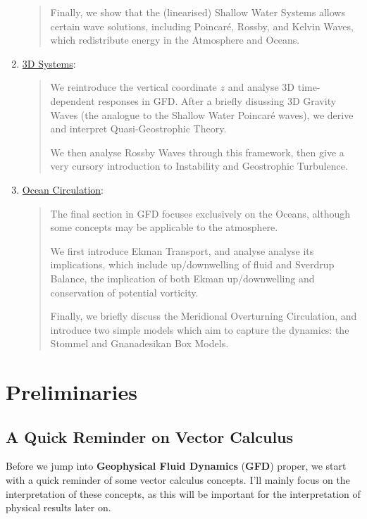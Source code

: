 \begin{enumerate}
\begin{quote}
            Finally, we show that the (linearised) Shallow Water Systems allows certain wave solutions, including Poincaré, Rossby, and Kelvin Waves, which redistribute energy in the Atmosphere and Oceans.
        \end{quote}
    
    \item \hyperref[3D Systems]{3D Systems}:
        
        \begin{quote}
            We reintroduce the vertical coordinate $z$ and analyse 3D time-dependent responses in GFD. After a briefly disussing 3D Gravity Waves (the analogue to the Shallow Water Poincaré waves), we derive and interpret Quasi-Geostrophic Theory.
            
            We then analyse Rossby Waves through this framework, then give a very cursory introduction to Instability and Geostrophic Turbulence.
        \end{quote}

    \item \hyperref[Oceans]{Ocean Circulation}:
        
        \begin{quote}
            The final section in GFD focuses exclusively on the Oceans, although some concepts may be applicable to the atmosphere. 
            
            We first introduce Ekman Transport, and analyse analyse its implications, which include up/downwelling of fluid and Sverdrup Balance, the implication of both Ekman up/downwelling and conservation of potential vorticity.
            
            Finally, we briefly discuss the Meridional Overturning Circulation, and introduce two simple models which aim to capture the dynamics: the Stommel and Gnanadesikan Box Models.
        \end{quote}
\end{enumerate}

\chapter{Preliminaries}\label{Prelim GFD}

\section{A Quick Reminder on Vector Calculus}

Before we jump into \textbf{Geophysical Fluid Dynamics} (\textbf{GFD}) proper, we start with a quick reminder of some vector calculus concepts. I'll mainly focus on the interpretation of these concepts, as this will be important for the interpretation of physical results later on.

